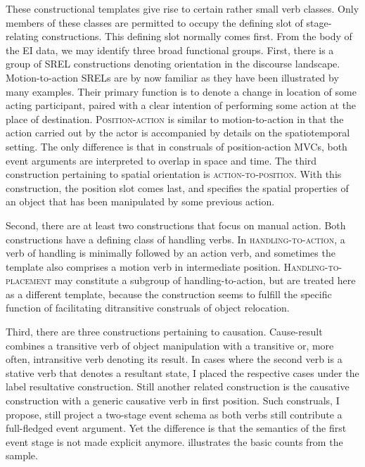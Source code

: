 These constructional templates give rise to certain rather small verb classes. Only members of these classes are permitted to occupy the defining slot of stage-relating constructions. This defining slot normally comes first. From the body of the EI data, we may identify three broad functional groups. First, there is a group of SREL constructions denoting orientation in the discourse landscape. Motion-to-action SRELs are by now familiar as they have been illustrated by many examples. Their primary function is to denote a change in location of some acting participant, paired with a clear intention of performing some action at the place of destination. \textsc{Position-action} is similar to motion-to-action in that the action carried out by the actor is accompanied by details on the spatiotemporal setting. The only difference is that in construals of position-action MVCs, both event arguments are interpreted to overlap in space and time. The third construction pertaining to spatial orientation is \textsc{action-to-position}. With this construction, the position slot comes last, and specifies the spatial properties of an object that has been manipulated by some previous action. 

Second, there are at least two constructions that focus on manual action. Both constructions have a defining class of handling verbs. In \textsc{handling-to-action}, a verb of handling is minimally followed by an action verb, and sometimes the template also comprises a motion verb in intermediate position. \textsc{Handling-to-placement} may constitute a subgroup of handling-to-action, but are treated here as a different template, because the construction seems to fulfill the specific function of facilitating ditransitive construals of object relocation.

Third, there are three constructions pertaining to causation. Cause-result combines a transitive verb of object manipulation with a transitive or, more often, intransitive verb denoting its result. In cases where the second verb is a stative verb that denotes a resultant state, I placed the respective cases under the label resultative construction. Still another related construction is the causative construction with a generic causative verb in first position. Such construals, I propose, still project a two-stage event schema as both verbs still contribute a full-fledged event argument. Yet the difference is that the semantics of the first event stage is not made explicit anymore.  illustrates the basic counts from the sample.

